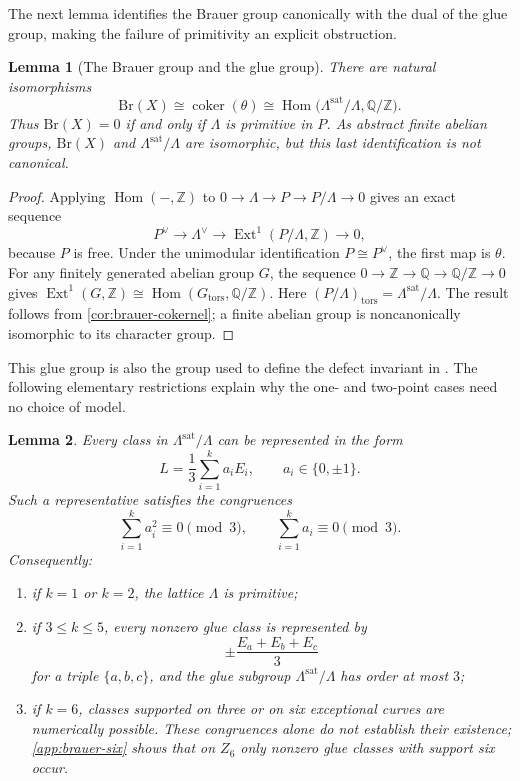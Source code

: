 \documentclass[11pt]{article}
\theoremstyle{plain}
\newtheorem{lemma}[lemma]{Lemma}
\theoremstyle{definition}
\theoremstyle{remark}
\newcommand{\Z}{\mathbb Z}
\newcommand{\Hom}{\operatorname{Hom}}
\newcommand{\Ext}{\operatorname{Ext}}
\newcommand{\Br}{\mathrm{Br}}
\begin{document}
The next lemma identifies the Brauer group canonically with the dual of
the glue group, making the failure of primitivity an explicit obstruction.

\begin{lemma}[The Brauer group and the glue group]\label{lem:brauer-glue-duality}
There are natural isomorphisms
\[
\Br(X)\cong\operatorname{coker}(\theta)
\cong\Hom\bigl(\Lambda^{\mathrm{sat}}/\Lambda,\mathbb Q/\Z\bigr).
\]
Thus \(\Br(X)=0\) if and only if \(\Lambda\) is primitive in \(P\).
As abstract finite abelian groups, \(\Br(X)\) and
\(\Lambda^{\mathrm{sat}}/\Lambda\) are isomorphic, but this last
identification is not canonical.
\end{lemma}

\begin{proof}
Applying \(\Hom(-,\Z)\) to \(0\to\Lambda\to P\to P/\Lambda\to0\)
gives an exact sequence
\[
P^\vee\longrightarrow\Lambda^\vee
\longrightarrow\Ext^1(P/\Lambda,\Z)\longrightarrow0,
\]
because \(P\) is free. Under the unimodular identification
\(P\cong P^\vee\), the first map is \(\theta\). For any finitely
generated abelian group \(G\), the sequence
\(0\to\Z\to\mathbb Q\to\mathbb Q/\Z\to0\) gives
\(\Ext^1(G,\Z)\cong\Hom(G_{\mathrm{tors}},\mathbb Q/\Z)\).
Here \((P/\Lambda)_{\mathrm{tors}}=\Lambda^{\mathrm{sat}}/\Lambda\).
The result follows from \cref{cor:brauer-cokernel}; a finite abelian
group is noncanonically isomorphic to its character group.
\end{proof}

This glue group is also the group used to define the defect invariant in
\cite[Section~2.1]{Corti2016}. The following elementary restrictions
explain why the one- and two-point cases need no choice of model.

\begin{lemma}\label{lem:brauer-glue-vectors}
Every class in
\(\Lambda^{\mathrm{sat}}/\Lambda\) can be represented in the form
\[
L=\frac13\sum_{i=1}^k a_iE_i,
\qquad
a_i\in\{0,\pm1\}.
\]
Such a representative satisfies the congruences
\[
\sum_{i=1}^k a_i^2\equiv0\pmod3,
\qquad
\sum_{i=1}^k a_i\equiv0\pmod3.
\]
Consequently:
\begin{enumerate}[label=\textup{(\roman*)}]
\item if \(k=1\) or \(k=2\), the lattice \(\Lambda\) is primitive;
\item if \(3\leq k\leq5\), every nonzero glue class is represented by
\[
\pm\frac{E_a+E_b+E_c}{3}
\]
for a triple \(\{a,b,c\}\), and the glue subgroup
\(\Lambda^{\mathrm{sat}}/\Lambda\) has order at most \(3\);
\item if \(k=6\), classes supported on three or on six exceptional curves are
numerically possible. These congruences alone do not establish their
existence; \cref{app:brauer-six} shows that on \(Z_6\) only nonzero
glue classes with support six occur.
\end{enumerate}
\end{lemma}
\end{document}
